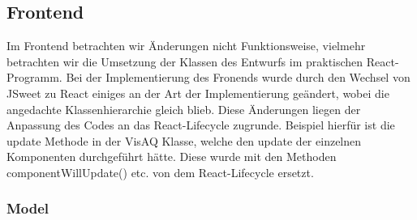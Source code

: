 \subsection{Frontend}
Im Frontend betrachten wir Änderungen nicht Funktionsweise, vielmehr betrachten wir die Umsetzung der Klassen des Entwurfs im praktischen React-Programm.
Bei der Implementierung des Fronends wurde durch den Wechsel von JSweet zu React einiges an der Art der Implementierung geändert, wobei die angedachte Klassenhierarchie gleich blieb.
Diese Änderungen liegen der Anpassung des Codes an das \gls{React-Lifecycle} zugrunde. Beispiel hierfür ist die update Methode in der VisAQ Klasse, welche den update der einzelnen Komponenten
durchgeführt hätte. Diese wurde mit den Methoden componentWillUpdate() etc. von dem \gls{React-Lifecycle} ersetzt. 

\subsubsection{Model}
\toJSON
{}
\toJSON
{}
\toJSON
{}
\toJSON
{}
\toJSON
{}
\toJSON
{}
\toJSON
{}
\toJSON
{}
\toJSON
{}
\toJSON
{}
\toJSON
{}
\toJSON

